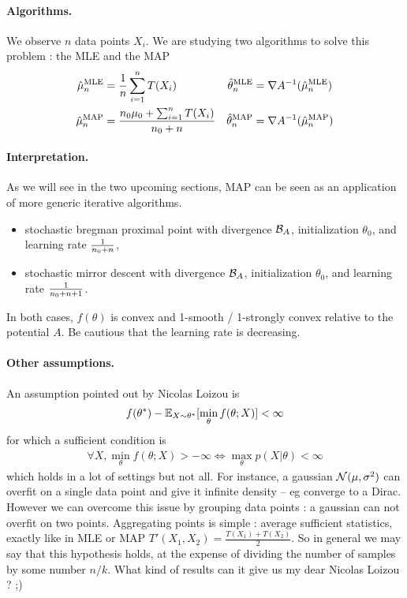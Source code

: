 \documentclass{article}
\newcommand{\logpart}{A}
\newcommand{\bregman}{\cB_\logpart}
\newcommand{\natp}{\theta}
\newcommand{\MAPm}{\hat \mu_n}
\newcommand{\MAPt}{\hat \natp_n}
\begin{document}
\paragraph{Algorithms.}
We observe $n$ data points $X_i$. 
We are studying two algorithms to solve this problem : the MLE and the MAP
\begin{align}
	\MAPm^\text{MLE} &= \inv{n}\sum_{i=1}^n T(X_i) 
	&\MAPt^\text{MLE} &= \nabla\logpart^{-1}(\MAPm^\text{MLE}) \\
	\MAPm^\text{MAP} &= \frac{n_0\mu_0 + \smallsum_{i=1}^n T(X_i)}{n_0 + n}
	&\MAPt^\text{MAP} &= \nabla\logpart^{-1}(\MAPm^\text{MAP})	
\end{align}

\paragraph{Interpretation.}
As we will see in the two upcoming sections, MAP can be seen as an application of more generic iterative algorithms. 
\begin{itemize}
	\item stochastic bregman proximal point with divergence $\bregman$, initialization $\natp_0$, and learning rate $\frac{1}{n_0+n}$,
	\item stochastic mirror descent with divergence $\bregman$, initialization $\natp_0$, and learning rate  $\frac{1}{n_0+n +1}$.
\end{itemize}
In both cases, $f(\natp)$ is convex and 1-smooth / 1-strongly convex relative to the potential $\logpart$. Be cautious that the learning rate is decreasing.


\paragraph{Other assumptions.}
An assumption pointed out by Nicolas Loizou is 
\begin{align}
	f(\natp^*) - \E_{X\sim\natp^*}[\min_\natp f(\natp ; X)] < \infty
\end{align}
for which a sufficient condition is 
\begin{align}
\forall X, \min_\natp f(\natp ; X) >	 - \infty \iff \max_\natp p(X|\natp) < \infty
\end{align}
which holds in a lot of settings but not all. For instance, a gaussian ${\mathcal N}(\mu,\sigma^2)$ can overfit on a single data point and give it infinite density -- eg converge to a Dirac. However we can overcome this issue by grouping data points : a gaussian can not overfit on two points. Aggregating points is simple : average sufficient statistics, exactly like in MLE or MAP $T'(X_1,X_2) = \frac{T(X_1) + T(X_2)}{2}$. 
So in general we may say that this hypothesis holds, at the expense of dividing the number of samples by some number $n/k$. What kind of results can it give us my dear Nicolas Loizou ? ;)
\end{document}
